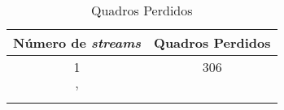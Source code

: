 
\begin{table}[H]
    \centering
    \caption{Quadros Perdidos}
    \label{tab:results:dropped_frames_table}
    \begin{tabular}{|c|c|}
    \toprule
    Número de \textit{streams} & Quadros Perdidos \\
    \midrule
    1 & 306 \\'
    \bottomrule
    \end{tabular}
\end{table}
